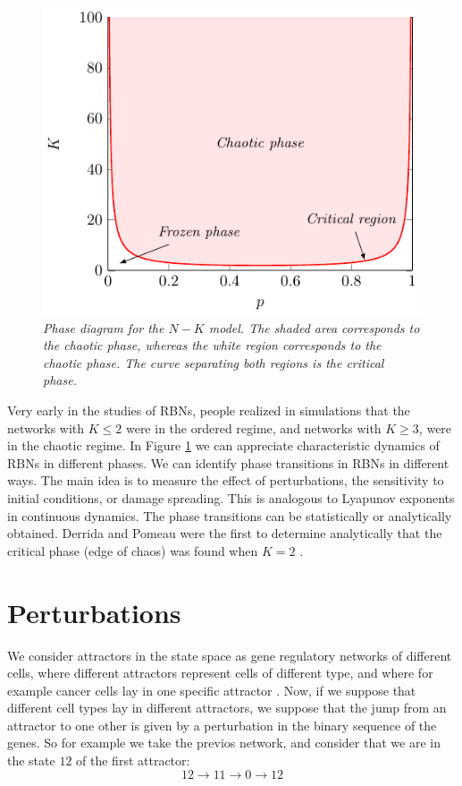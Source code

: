 \begin{figure}[h]
\centering
\includegraphics[scale=1.2]{images/phase-transition.pdf}
\caption{\emph{Phase diagram for the $N-K$ model. The shaded area corresponds
to the chaotic phase, whereas the white region corresponds to the chaotic phase.
The curve separating both regions is the critical phase.}}
\label{fig:ph-tr}
\end{figure}

Very early in the studies of
RBNs, people realized in simulations that the networks with
$K \le 2$ were in the ordered regime, and networks with $K \ge 3$,
were in the chaotic regime. In Figure \ref{fig:ph-tr} we can appreciate
characteristic dynamics of RBNs in different phases.
We can identify phase transitions in RBNs in different
ways. The main idea is to measure the effect of perturbations, the sensitivity to initial conditions, or damage spreading. This is analogous to Lyapunov exponents in continuous
dynamics.
The phase transitions can be statistically or analytically
obtained. Derrida and Pomeau were the first to determine
analytically that the critical phase (edge of chaos) was found
when $K = 2$ \cite{K8}.

\section{Perturbations}
We consider attractors in the state space as gene regulatory networks of different cells, where different attractors represent cells of different type, and where for example cancer cells lay in one specific attractor \cite{K3}\cite{K2}.
Now, if we suppose that different cell types lay in different attractors, we  suppose that the jump from an attractor to one other is given by a perturbation in the binary sequence of the genes.
So for example we take the previos network, and consider that we are in the state $12$ of the first attractor:
$$
12 \to 11 \to 0 \to 12
$$

